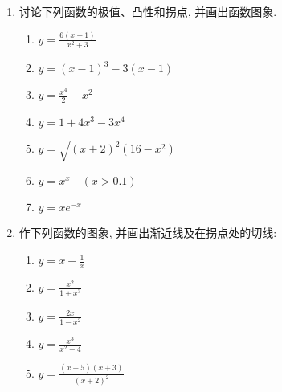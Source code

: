 \begin{ex}
\begin{enumerate}
    \item 讨论下列函数的极值、凸性和拐点, 并画出函数图象.
\begin{multicols}{2}
\begin{enumerate}
\item  $y=\frac{6(x-1)}{x^{2}+3}$
\item  $y=(x-1)^{3}-3(x-1)$
\item  $y=\frac{x^{4}}{2}-x^{2}$
\item  $y=1+4 x^{3}-3 x^{4}$
\item  $y=\sqrt{(x+2)^{2}\left(16-x^{2}\right)}$
\item  $y=x^{x}\quad (x>0.1)$
\item  $y=x e^{-x}$
\end{enumerate}
\end{multicols}

    \item 作下列函数的图象, 并画出渐近线及在拐点处的切线:
    \begin{multicols}{2}
        \begin{enumerate}
            \item $y=x+\frac{1}{x}$
            \item $y=\frac{x^{2}}{1+x^{3}}$
            \item $y=\frac{2 x}{1-x^{2}}$
            \item $y=\frac{x^{3}}{x^{2}-4}$
            \item $y=\frac{(x-5)(x+3)}{(x+2)^{2}}$
\end{enumerate}
\end{multicols}
\end{enumerate}
\end{ex}

